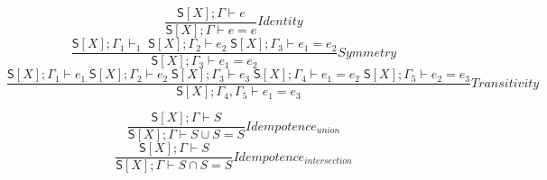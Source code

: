 \[\frac{ \mathsf{S}[X]; \Gamma \vdash e }{ \mathsf{S}[X]; \Gamma  \vdash e = e}Identity\]
\[\frac{\mathsf{S}[X]; \Gamma_{1} \vdash _{1}\; \mathsf{S}[X]; \Gamma_{2} \vdash e_{2}\; \mathsf{S}[X]; \Gamma_{3}  \vdash e_{1} = e_{2}}{ \mathsf{S}[X]; \Gamma_{3}  \vdash e_{1} = e_{2}}Symmetry\]
\[\frac{\mathsf{S}[X]; \Gamma_{1}  \vdash e_{1}\; \mathsf{S}[X]; \Gamma_{2}  \vdash e_{2}\; \mathsf{S}[X]; \Gamma_{3} \vdash e_{3}\; \mathsf{S}[X]; \Gamma_{4}  \vdash e_{1} = e_{2} \; \mathsf{S}[X]; \Gamma_{5}  \vdash e_{2} = e_{3}}{ \mathsf{S}[X]; \Gamma_{4},\Gamma_{5}  \vdash e_{1} = e_{3}}Transitivity\]

\[\frac{\mathsf{S}[X]; \Gamma  \vdash S}{\mathsf{S}[X]; \Gamma \vdash S \cup S =  S}Idempotence_{union}\]
\[\frac{\mathsf{S}[X]; \Gamma  \vdash S}{\mathsf{S}[X]; \Gamma \vdash S \cap S =  S}Idempotence_{intersection}\]



